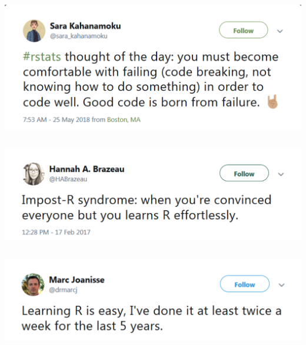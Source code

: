 \documentclass[
  letterpaper,
  DIV=11,
  numbers=noendperiod,
  oneside]{scrartcl}
\begin{document}
\hypertarget{section-1}{%
\subsection{}\label{section-1}}

\includegraphics{./images/r-thought_1.png}

\hypertarget{section-2}{%
\subsection{}\label{section-2}}

\includegraphics{./images/r-thought_2.png}

\hypertarget{section-3}{%
\subsection{}\label{section-3}}

\includegraphics{./images/r-thought_3.png}

\hypertarget{section-4}{%
\subsection{}\label{section-4}}
\end{document}

